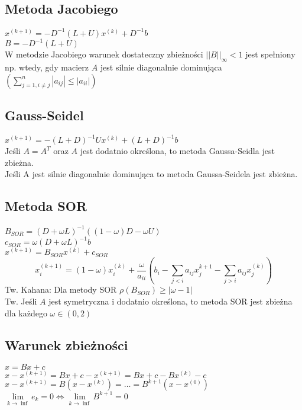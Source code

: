 \documentclass[twocolumn]{article}
\begin{document}
\begin{flushleft}
\subsection{Metoda Jacobiego}
$x^{(k+1)} = -D^{-1}(L+U)x^{(k)}+D^{-1}b$\\
$B = -D^{-1}(L+U)$\\
W metodzie Jacobiego warunek dostateczny zbieżności $||B||_{\infty} < 1$ jest spełniony np. wtedy, gdy macierz $A$ jest silnie diagonalnie dominująca $\left(\sum_{j=1,i\neq j}^n |a_{ij}| \leq |a_{ii}|\right)$
\begin{algorithmic}
\ENDFOR
\end{algorithmic}
\subsection{Gauss-Seidel}
$x^{(k+1)} = -(L+D)^{-1}Ux^{(k)}+(L+D)^{-1}b$\\
Jeśli $A=A^T$ oraz $A$ jest dodatnio określona, to metoda Gaussa-Seidla jest zbieżna.\\
Jeśli A jest silnie diagonalnie dominująca to metoda Gaussa-Seidela jest zbieżna.
\subsection{Metoda SOR}
$B_{SOR} = (D + \omega L)^{-1}((1- \omega)D - \omega U)$\\
$c_{SOR}=\omega(D+\omega L)^{-1}b$\\
$x^{(k+1)}=B_{SOR}x^{(k)}+c_{SOR}$\\
$$x_i^{(k+1)} = (1 - \omega)x_i^{(k)} + \frac{\omega}{a_{ii}}\left( b_i- \sum_{j<i}a_{ij}x_j^{k+1} - \sum_{j>i}a_{ij}x_j^{(k)} \right)$$
Tw. Kahana: Dla metody SOR $\rho(B_{SOR})\geq|\omega - 1|$\\
Tw. Jeśli $A$ jest symetryczna i dodatnio określona, to metoda SOR jest zbieżna dla każdego $\omega \in (0,2)$
\subsection{Warunek zbieżności}
\thispagestyle{empty} %
$x = Bx + c$\\
$x - x^{(k+1)} = Bx + c - x^{(k+1)} = Bx+c -Bx^{(k)}-c$\\
$x-x^{(k+1)} = B(x-x^{(k)}) = \ldots = B^{k+1}(x-x^{(0)})$\\
$\underset{k \to \inf}{\lim} e_k = 0 \Leftrightarrow \underset{k \to \inf}{\lim} B^{k+1} = 0$

\end{flushleft}
\end{document}

